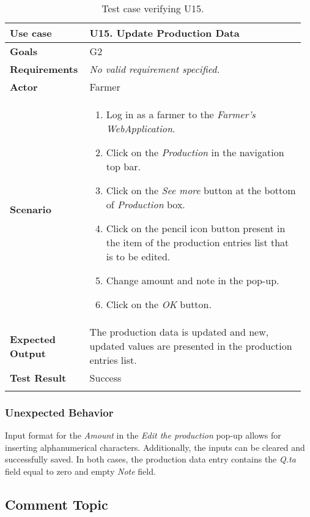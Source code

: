 \begin{longtable}{@{}p{0.25\linewidth}p{0.71\linewidth}@{}}
	\toprule
	\textbf{Use case} & \textbf{U15.} Update Production Data \\
	\midrule
	\textbf{Goals} & G2\\
	\midrule
	\textbf{Requirements} & \textit{No valid requirement specified.}\\
	\midrule
	\textbf{Actor} & Farmer\\
	\midrule
	\textbf{Scenario} & \begin{enumerate}[leftmargin=.4cm,noitemsep,topsep=0pt,before=\vspace{-3mm},after=\vspace{-4mm}]
		\item Log in as a farmer to the \textit{Farmer's WebApplication}.
		\item Click on the \textit{Production} in the navigation top bar.
		\item Click on the \textit{See more} button at the bottom of \textit{Production} box.
		\item Click on the pencil icon button present in the item of the production entries list that is to be edited.
		\item Change amount and note in the pop-up.
		\item Click on the \textit{OK} button.
	\end{enumerate}\\
	\midrule
	\textbf{Expected Output} & The production data is updated and new, updated values are presented in the production entries list.\\
	\midrule
	\textbf{Test Result} & Success\\
	\bottomrule
	\caption{Test case verifying U15.}
\end{longtable}


\subsubsection*{Unexpected Behavior}
Input format for the \textit{Amount} in the \textit{Edit the production} pop-up allows for inserting alphanumerical characters. Additionally, the inputs can be cleared and successfully saved. In both cases, the production data entry contains the \textit{Q.ta} field equal to zero and empty \textit{Note} field.


\subsection{Comment Topic}

